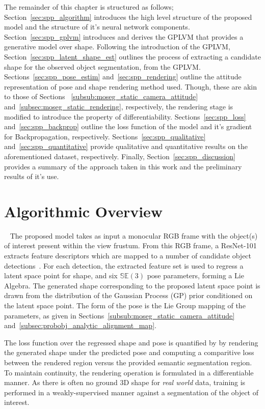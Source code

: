 The remainder of this chapter is structured as follows; Section~\ref{sec:spp_algorithm} introduces the high level 
structure of the proposed model and the structure of it's neural network components. Section~\ref{sec:spp_gplvm} 
introduces and derives the GPLVM that provides a generative model over shape. Following the introduction 
of the GPLVM, Section~\ref{sec:spp_latent_shape_est} outlines the process of extracting a candidate shape for the observed 
object segmentation, from the GPLVM\@. Sections~\ref{sec:spp_pose_estim} and~\ref{sec:spp_rendering} outline the attitude 
representation of pose and shape rendering method used. Though, these are akin to those of Sections
~\ref{subsub:moseg_static_camera_attitude} and~\ref{subsec:moseg_static_rendering}, respectively, the rendering stage is 
modified to introduce the property of differentiability. Sections~\ref{sec:spp_loss} and~\ref{sec:spp_backprop} 
outline the loss function of the model and it's gradient for Backpropagation, respectively. Sections~\ref{sec:spp_qualitative} 
and~\ref{sec:spp_quantitative} provide qualitative and quantitative results on the aforementioned dataset, respectively. 
Finally, Section~\ref{sec:spp_discussion} provides a summary of the approach taken in this work and the preliminary results 
of it's use.

\section{Algorithmic Overview}
~\label{sec:spp_algorithm}
The proposed model takes as input a monocular RGB frame with the object(s) of interest present within the 
view frustum. From this RGB frame, a ResNet-101~\cite{He2015} extracts feature descriptors which are mapped 
to a number of candidate object detections~\cite{Girshick2014,Girshick2015_2}. For each detection, the extracted 
feature set is used to regress a latent space point for shape, and six \( \mathbb{SE}(3) \) pose parameters, forming 
a Lie Algebra. The generated shape corresponding to the proposed latent space point is drawn from the distribution 
of the Gaussian Process (GP) prior conditioned on the latent space point. The form of the pose is the Lie 
Group mapping of the parameters, as given in Sections~\ref{subsub:moseg_static_camera_attitude} 
and~\ref{subsec:probobj_analytic_alignment_map}. 

The loss function over the regressed shape and pose is quantified by by rendering the generated shape 
under the predicted pose and computing a comparitive loss between the rendered region versus the provided semantic 
segmentation region. To maintain continuity, the rendering operation is formulated in a differentiable manner. As there 
is often no ground 3D shape for \textit{real world} data, training is performed in a weakly-supervised manner against a 
segmentation of the object of interest.

